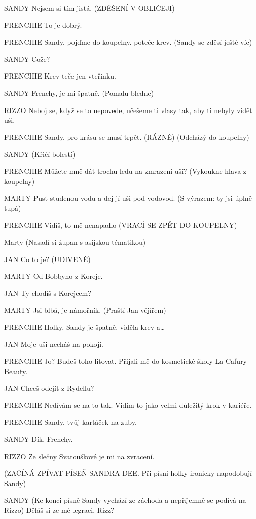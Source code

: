 SANDY        Nejsem si tím jistá. (ZDĚŠENÍ V OBLIČEJI)

FRENCHIE        To je dobrý. 

FRENCHIE        Sandy, pojďme do koupelny. poteče krev. (Sandy se zděsí ještě víc)

SANDY        Cože?

FRENCHIE        Krev teče jen vteřinku.

SANDY        Frenchy, je mi špatně. (Pomalu bledne)

RIZZO        Neboj se, když se to nepovede, učešeme ti vlasy tak, aby ti nebyly vidět         uši.

FRENCHIE        Sandy, pro krásu se musí trpět. (RÁZNĚ) (Odcházý do koupelny) 

SANDY        (Křičí bolestí)

FRENCHIE        Můžete mně dát trochu ledu na zmrazení uší? (Vykoukne hlava z                 koupelny)

MARTY        Pusť studenou vodu a dej jí uši pod vodovod. (S výrazem: ty jsi úplně         tupá) 

FRENCHIE        Vidíš, to mě nenapadlo (VRACÍ SE ZPĚT DO KOUPELNY)

 Marty  (Nasadí si župan s asijskou tématikou)

JAN        Co to je? (UDIVENĚ)

MARTY        Od Bobbyho z Koreje.

JAN        Ty chodíš s Korejcem? 

MARTY        Jsi blbá, je námořník. (Praští Jan vějířem) 

FRENCHIE        Holky, Sandy je špatně. viděla krev a…

JAN        Moje uši necháš na pokoji.

FRENCHIE        Jo? Budeš toho litovat. Přijali mě do kosmetické školy La Cafury Beauty.

JAN        Chceš odejít z Rydellu?

FRENCHIE        Nedívám se na to tak. Vidím to jako velmi důležitý krok v kariéře.

FRENCHIE        Sandy, tvůj kartáček na zuby.

SANDY        Dík, Frenchy. 

RIZZO        Ze slečny Svatouškové je mi na zvracení.

        (ZAČÍNÁ ZPÍVAT PÍSEŇ SANDRA DEE. Při písni holky ironicky                 napodobují Sandy)

SANDY        (Ke konci písně Sandy vychází ze záchoda a nepříjemně se podívá na         Rizzo)  Děláš si ze mě legraci, Rizz?

